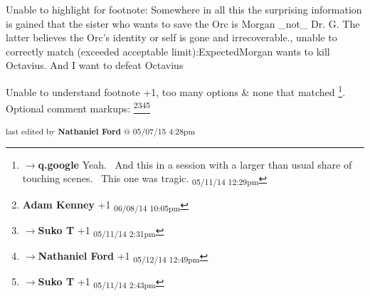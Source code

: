 	Unable to highlight for footnote: Somewhere in all this the surprising information is gained that the sister who wants to save the Orc is Morgan _not_ Dr. G.  The latter believes the Orc's identity or self is gone and irrecoverable., unable to correctly match (exceeded acceptable limit):ExpectedMorgan wants to kill Octavius. And I want to defeat Octavius

	Unable to understand footnote +1, too many options & none that matched \footnote{$\rightarrow$\textbf{q.google }Yeah.  And this in a session with a larger than usual share of touching scenes.  This one was tragic. \textsubscript{05/11/14 12:29pm}}. Optional comment markups: \footnote{\textbf{Adam Kenney }+1 \textsubscript{06/08/14 10:05pm}}\footnote{$\rightarrow$\textbf{Suko T }+1 \textsubscript{05/11/14 2:31pm}}\footnote{$\rightarrow$\textbf{Nathaniel Ford }+1 \textsubscript{05/12/14 12:49pm}}\footnote{$\rightarrow$\textbf{Suko T }+1 \textsubscript{05/11/14 2:43pm}} 


\fi

\vspace{\fill}

\begin{flushright}
\textsubscript{last edited by \textbf{Nathaniel Ford} @ 05/07/15 4:28pm}
\end{flushright}

